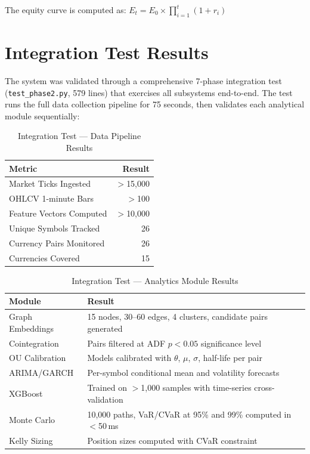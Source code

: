 \documentclass[letterpaper,11pt]{report}
\begin{document}
The equity curve is computed as: $E_t = E_0 \times \prod_{i=1}^{t}(1 + r_i)$

\section{Integration Test Results}

The system was validated through a comprehensive 7-phase integration test (\texttt{test\_phase2.py}, 579 lines) that exercises all subsystems end-to-end. The test runs the full data collection pipeline for 75 seconds, then validates each analytical module sequentially:

\begin{table}[h]
\centering
\caption{Integration Test --- Data Pipeline Results}
\begin{tabular}{lr}
\toprule
\textbf{Metric} & \textbf{Result} \\
\midrule
Market Ticks Ingested &  $>$15,000 \\
OHLCV 1-minute Bars &  $>$100 \\
Feature Vectors Computed & $>$10,000 \\
Unique Symbols Tracked & 26 \\
Currency Pairs Monitored & 26 \\
Currencies Covered & 15 \\
\bottomrule
\end{tabular}
\end{table}

\begin{table}[h]
\centering
\caption{Integration Test --- Analytics Module Results}
\begin{tabular}{lp{8cm}}
\toprule
\textbf{Module} & \textbf{Result} \\
\midrule
Graph Embeddings & 15 nodes, 30--60 edges, 4 clusters, candidate pairs generated \\
Cointegration & Pairs filtered at ADF $p < 0.05$ significance level \\
OU Calibration & Models calibrated with $\theta$, $\mu$, $\sigma$, half-life per pair \\
ARIMA/GARCH & Per-symbol conditional mean and volatility forecasts \\
XGBoost & Trained on $>$1,000 samples with time-series cross-validation \\
Monte Carlo & 10,000 paths, VaR/CVaR at 95\% and 99\% computed in $<$50\,ms \\
Kelly Sizing & Position sizes computed with CVaR constraint \\
\bottomrule
\end{tabular}
\end{table}
\end{document}
